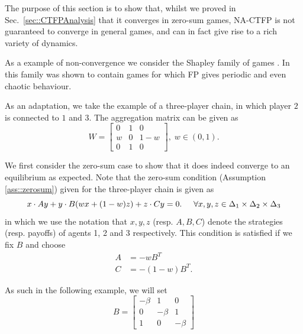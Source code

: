 \documentclass{article}
\theoremstyle{definition}
\begin{document}
  The purpose of this section is to show that, whilst we proved in Sec.~\ref{sec::CTFPAnalysis}
  that it converges in zero-sum games, NA-CTFP is not guaranteed to
  converge in general games, and can in fact give rise to a rich 
  variety of dynamics.

  As a example of non-convergence we consider the Shapley family of games \cite{Shapley2016}. In \cite{VanStrien2011} this family was shown to contain games for which FP gives periodic and even chaotic behaviour.

  As an adaptation, we take the example of a three-player chain, in which player $2$ is connected to $1$ and $3$. The aggregation matrix can be given as
%
  \begin{equation*}
    W = \begin{bmatrix}
      0 & 1 & 0 \\
      w & 0 & 1 - w \\
      0 & 1 & 0
    \end{bmatrix}, \; w \in (0, 1).
  \end{equation*}


  We first consider the zero-sum case to show that it does indeed converge to an equilibrium as expected. Note that the zero-sum condition (Assumption \ref{ass::zerosum}) given for the three-player chain is given as
%
  \begin{equation}
    x \cdot A y + y \cdot B (w x + (1-w)z) + z \cdot C y = 0. \hspace{0.5cm} \forall x, y, z \in \Delta_1 \times \Delta_2 \times \Delta_3
  \end{equation}
  in which we use the notation that $x, y, z$ (resp. $A, B, C$) denote the strategies (resp. payoffs) of agents 1, 2 and 3 respectively. This condition is satisfied if we fix $B$ and choose
%
  \begin{align} \label{eq::zeroSumShapley}
    A & = - w B^T \nonumber \\
    C & = - (1 - w) B^T. 
  \end{align}

  As such in the following example, we will set
  \begin{equation}
    B =  \begin{bmatrix}
      - \beta & 1 & 0 \\
      0 & -\beta & 1 \\
      1 & 0 & -\beta
    \end{bmatrix}
  \end{equation}
  
\end{document}
